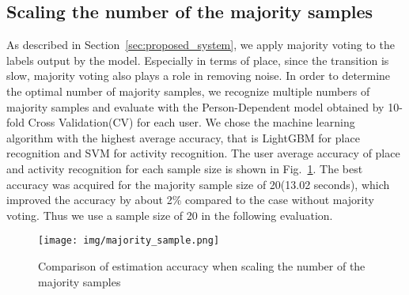 \documentclass[conference]{IEEEtran}
\begin{document}
\subsection{Scaling the number of the majority samples}
As described in Section~\ref{sec:proposed_system}, we apply majority voting to the labels output by the model.
Especially in terms of place, since the transition is slow, majority voting also plays a role in removing noise.
In order to determine the optimal number of majority samples, we recognize multiple numbers of majority samples and evaluate with the Person-Dependent model obtained by 10-fold Cross Validation(CV) for each user.
We chose the machine learning algorithm with the highest average accuracy, that is LightGBM for place recognition and SVM for activity recognition.
The user average accuracy of place and activity recognition for each sample size is shown in Fig.~\ref{fig:majority_sample_scaling}.
The best accuracy was acquired for the majority sample size of 20(13.02 seconds), which improved the accuracy by about 2\% compared to the case without majority voting.
Thus we use a sample size of 20 in the following evaluation.

\begin{figure}[t]
    \centering
    \texttt{[image: img/majority\_sample.png]}
    \caption{Comparison of estimation accuracy when scaling the number of the majority samples}
    \label{fig:majority_sample_scaling}
\end{figure}
\end{document}
